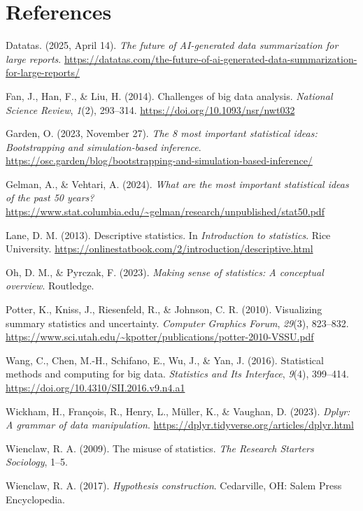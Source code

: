 \documentclass[
  man,
  floatsintext,
  longtable,
  nolmodern,
  notxfonts,
  notimes,
  colorlinks=true,linkcolor=blue,citecolor=blue,urlcolor=blue]{apa7}
\newlength{\cslhangindent}
\newenvironment{CSLReferences}[2] %
 {\begin{list}{}{%
  \setlength{\itemindent}{0pt}
  \setlength{\leftmargin}{0pt}
  \setlength{\parsep}{0pt}
  \ifodd #1
   \setlength{\leftmargin}{\cslhangindent}
   \setlength{\itemindent}{-1\cslhangindent}
  \fi
  \setlength{\itemsep}{#2\baselineskip}}}
 {\end{list}}
\begin{document}
\newpage

\section{References}\label{references}

\label{refs}
\begin{CSLReferences}{1}{0}
Datatas. (2025, April 14). \emph{The future of AI-generated data
summarization for large reports}.
\url{https://datatas.com/the-future-of-ai-generated-data-summarization-for-large-reports/}

Fan, J., Han, F., \& Liu, H. (2014). Challenges of big data analysis.
\emph{National Science Review}, \emph{1}(2), 293--314.
\url{https://doi.org/10.1093/nsr/nwt032}

Garden, O. (2023, November 27). \emph{The 8 most important statistical
ideas: Bootstrapping and simulation-based inference}.
\url{https://osc.garden/blog/bootstrapping-and-simulation-based-inference/}

Gelman, A., \& Vehtari, A. (2024). \emph{What are the most important
statistical ideas of the past 50 years?}
\url{https://www.stat.columbia.edu/~gelman/research/unpublished/stat50.pdf}

Lane, D. M. (2013). Descriptive statistics. In \emph{Introduction to
statistics}. Rice University.
\url{https://onlinestatbook.com/2/introduction/descriptive.html}

Oh, D. M., \& Pyrczak, F. (2023). \emph{Making sense of statistics: A
conceptual overview}. Routledge.

Potter, K., Kniss, J., Riesenfeld, R., \& Johnson, C. R. (2010).
Visualizing summary statistics and uncertainty. \emph{Computer Graphics
Forum}, \emph{29}(3), 823--832.
\url{https://www.sci.utah.edu/~kpotter/publications/potter-2010-VSSU.pdf}

Wang, C., Chen, M.-H., Schifano, E., Wu, J., \& Yan, J. (2016).
Statistical methods and computing for big data. \emph{Statistics and Its
Interface}, \emph{9}(4), 399--414.
\url{https://doi.org/10.4310/SII.2016.v9.n4.a1}

Wickham, H., François, R., Henry, L., Müller, K., \& Vaughan, D. (2023).
\emph{Dplyr: A grammar of data manipulation}.
\url{https://dplyr.tidyverse.org/articles/dplyr.html}

Wienclaw, R. A. (2009). The misuse of statistics. \emph{The Research
Starters Sociology}, 1--5.

Wienclaw, R. A. (2017). \emph{Hypothesis construction}. Cedarville, OH:
Salem Press Encyclopedia.

\end{CSLReferences}
\end{document}
